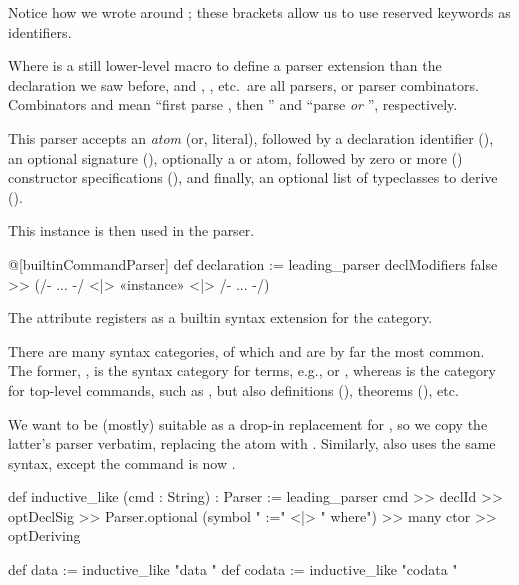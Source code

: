 \begin{remark}
  Notice how we wrote  around \inductive{}; these brackets allow us to use 
  reserved keywords as identifiers.
\end{remark}

Where  is 
a still lower-level macro to define a parser extension than the  declaration we saw before, and
, , etc.\ are all parsers, or parser combinators. Combinators  and  mean ``first parse , then '' and ``parse  \emph{or} '', respectively.

This parser accepts an  \emph{atom} (or, literal), followed by a declaration identifier (), an optional signature (), optionally a  or  atom, followed by zero or more () constructor specifications (), and finally, an optional list of typeclasses to derive ().

This  instance is then used in the  parser.
\begin{leancode}
  @[builtinCommandParser] def declaration := leading_parser
          declModifiers false >> (/- ... -/ <|> «instance» <|> /- ... -/)
\end{leancode}

The  attribute registers  as a builtin syntax extension for the  category.

\begin{remark}
    There are many syntax categories, of which  and  are by far the most common.
    The former, , is the syntax category for terms, e.g.,  or , whereas  is the category for top-level commands, such as \inductive{}, but also definitions (), theorems (), etc.
  \end{remark}

We want \data{} to be (mostly) suitable as a drop-in replacement for \inductive{}, so we copy the latter's parser verbatim, replacing the  atom with . Similarly, \codata{} also uses the same syntax, except the command is now .
\begin{leancode}
  def inductive_like (cmd : String) : Parser
    := leading_parser cmd >> declId  >> optDeclSig  
                        >> Parser.optional  (symbol " :=" <|> " where") 
                        >> many ctor 
                        >> optDeriving

  def data   := inductive_like "data "
  def codata := inductive_like "codata "
\end{leancode}

